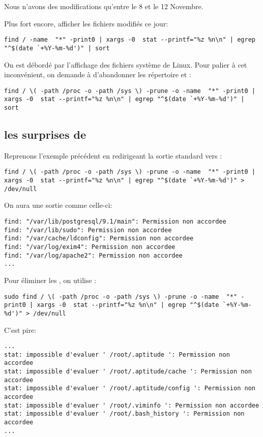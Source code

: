 Nous n'avons des modifications qu'entre le 8 et le 12 Novembre.

Plus fort encore, afficher les fichiers modifiés ce jour:

\begin{lstlisting}
find / -name  "*" -print0 | xargs -0  stat --printf="%z %n\n" | egrep "^$(date `+%Y-%m-%d')" | sort
\end{lstlisting}

On est débordé par l'affichage des fichiers système de Linux. Pour palier à cet inconvénient, on demande à  d'abandonner les répertoire  et :

\begin{lstlisting}
find / \( -path /proc -o -path /sys \) -prune -o -name  "*" -print0 | xargs -0  stat --printf="%z %n\n" | egrep "^$(date `+%Y-%m-%d')" | sort
\end{lstlisting}

\subsection{les surprises de }
Reprenons l'exemple précédent en redirigeant la sortie standard vers :

\begin{lstlisting}
find / \( -path /proc -o -path /sys \) -prune -o -name  "*" -print0 | xargs -0  stat --printf="%z %n\n" | egrep "^$(date `+%Y-%m-%d')" > /dev/null
\end{lstlisting}

On aura une sortie comme celle-ci:

\begin{lstlisting}
find: "/var/lib/postgresql/9.1/main": Permission non accordee
find: "/var/lib/sudo": Permission non accordee
find: "/var/cache/ldconfig": Permission non accordee
find: "/var/log/exim4": Permission non accordee
find: "/var/log/apache2": Permission non accordee
...
\end{lstlisting}

Pour éliminer les , on utilise :

\begin{lstlisting}
sudo find / \( -path /proc -o -path /sys \) -prune -o -name  "*" -print0 | xargs -0  stat --printf="%z %n\n" | egrep "^$(date `+%Y-%m-%d')" > /dev/null
\end{lstlisting}

C'est pire:

\begin{lstlisting}
...
stat: impossible d'evaluer ' /root/.aptitude ': Permission non accordee
stat: impossible d'evaluer ' /root/.aptitude/cache ': Permission non accordee
stat: impossible d'evaluer ' /root/.aptitude/config ': Permission non accordee
stat: impossible d'evaluer ' /root/.viminfo ': Permission non accordee
stat: impossible d'evaluer ' /root/.bash_history ': Permission non accordee
...
\end{lstlisting}


